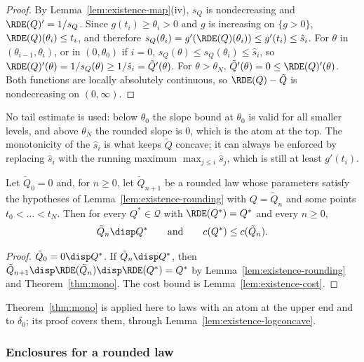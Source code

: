 \begin{proof}
By Lemma~\ref{lem:existence-map}(iv), $s_Q$ is nondecreasing and $\RDE(Q)'=1/s_Q$. Since
$g(t_i)\ge\theta_i>0$ and $g$ is increasing on $\{g>0\}$, $\RDE(Q)(\theta_i)\le t_i$, and
therefore $s_Q(\theta_i)=g'(\RDE(Q)(\theta_i))\le g'(t_i)\le\hat s_i$. For $\theta$ in
$(\theta_{i-1},\theta_i)$, or in $(0,\theta_0)$ if $i=0$,
$s_Q(\theta)\le s_Q(\theta_i)\le\hat s_i$, so
$\RDE(Q)'(\theta)=1/s_Q(\theta)\ge1/\hat s_i=\tilde Q'(\theta)$. For $\theta>\theta_N$,
$\tilde Q'(\theta)=0\le\RDE(Q)'(\theta)$. Both functions are locally absolutely continuous, so
$\RDE(Q)-\tilde Q$ is nondecreasing on $(0,\infty)$.
\end{proof}

No tail estimate is used: below $\theta_0$ the slope bound at $\theta_0$ is valid for all
smaller levels, and above $\theta_N$ the rounded slope is $0$, which is the atom at the top.
The monotonicity of the $\hat s_i$ is what keeps $\tilde Q$ concave; it can always be enforced
by replacing $\hat s_i$ with the running maximum $\max_{j\le i}\hat s_j$, which is still at
least $g'(t_i)$.

\begin{lemma}\label{lem:existence-chain}
Let $\tilde Q_0=0$ and, for $n\ge0$, let $\tilde Q_{n+1}$ be a rounded law whose parameters
satisfy the hypotheses of Lemma~\ref{lem:existence-rounding} with $Q=\tilde Q_n$ and some
points $t_0<\dots<t_N$. Then for every $Q^*\in\mathcal{Q}$ with $\RDE(Q^*)=Q^*$ and every
$n\ge0$,
\[
  \tilde Q_n\disp Q^*\qquad\text{and}\qquad c(Q^*)\le c(\tilde Q_n) .
\]
\end{lemma}

\begin{proof}
$\tilde Q_0=0\disp Q^*$. If $\tilde Q_n\disp Q^*$, then
$\tilde Q_{n+1}\disp\RDE(\tilde Q_n)\disp\RDE(Q^*)=Q^*$ by Lemma~\ref{lem:existence-rounding}
and Theorem~\ref{thm:mono}. The cost bound is Lemma~\ref{lem:existence-cost}.
\end{proof}

Theorem~\ref{thm:mono} is applied here to laws with an atom at the upper end and to
$\delta_0$; its proof covers them, through Lemma~\ref{lem:existence-logconcave}.

\subsubsection*{Enclosures for a rounded law}

